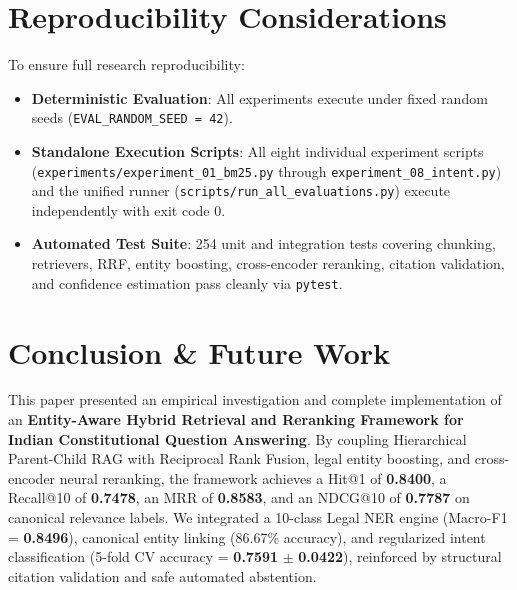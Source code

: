 \documentclass[10pt,twocolumn]{article}
\begin{document}
\section{Reproducibility Considerations}
\label{sec:reproducibility}

To ensure full research reproducibility:
\begin{itemize}[leftmargin=*]
    \item \textbf{Deterministic Evaluation}: All experiments execute under fixed random seeds (\texttt{EVAL\_RANDOM\_SEED = 42}).
    \item \textbf{Standalone Execution Scripts}: All eight individual experiment scripts (\texttt{experiments/experiment\_01\_bm25.py} through \texttt{experiment\_08\_intent.py}) and the unified runner (\texttt{scripts/run\_all\_evaluations.py}) execute independently with exit code 0.
    \item \textbf{Automated Test Suite}: 254 unit and integration tests covering chunking, retrievers, RRF, entity boosting, cross-encoder reranking, citation validation, and confidence estimation pass cleanly via \texttt{pytest}.
\end{itemize}

\section{Conclusion \& Future Work}
\label{sec:conclusion}

This paper presented an empirical investigation and complete implementation of an \textbf{Entity-Aware Hybrid Retrieval and Reranking Framework for Indian Constitutional Question Answering}. By coupling Hierarchical Parent-Child RAG with Reciprocal Rank Fusion, legal entity boosting, and cross-encoder neural reranking, the framework achieves a Hit@1 of \textbf{0.8400}, a Recall@10 of \textbf{0.7478}, an MRR of \textbf{0.8583}, and an NDCG@10 of \textbf{0.7787} on canonical relevance labels. We integrated a 10-class Legal NER engine (Macro-F1 = \textbf{0.8496}), canonical entity linking (86.67\% accuracy), and regularized intent classification (5-fold CV accuracy = \textbf{0.7591} $\pm$ \textbf{0.0422}), reinforced by structural citation validation and safe automated abstention.
\end{document}

